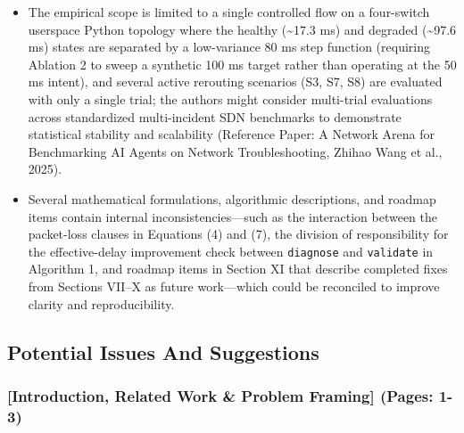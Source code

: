 \documentclass[11pt,a4paper]{article}
\begin{document}
\begin{itemize}[leftmargin=1.8em,itemsep=2pt]
\item The empirical scope is limited to a single controlled flow on a four-switch userspace Python topology where the healthy (\textasciitilde{}17.3 ms) and degraded (\textasciitilde{}97.6 ms) states are separated by a low-variance 80 ms step function (requiring Ablation 2 to sweep a synthetic 100 ms target rather than operating at the 50 ms intent), and several active rerouting scenarios (S3, S7, S8) are evaluated with only a single trial; the authors might consider multi-trial evaluations across standardized multi-incident SDN benchmarks to demonstrate statistical stability and scalability (Reference Paper: A Network Arena for Benchmarking AI Agents on Network Troubleshooting, Zhihao Wang et al., 2025).
\item Several mathematical formulations, algorithmic descriptions, and roadmap items contain internal inconsistencies—such as the interaction between the packet-loss clauses in Equations (4) and (7), the division of responsibility for the effective-delay improvement check between \texttt{diagnose} and \texttt{validate} in Algorithm 1, and roadmap items in Section XI that describe completed fixes from Sections VII–X as future work—which could be reconciled to improve clarity and reproducibility.
\end{itemize}
\subsection*{Potential Issues And Suggestions}
\subsubsection*{[Introduction, Related Work \& Problem Framing] (Pages: 1-3)}
\end{document}
